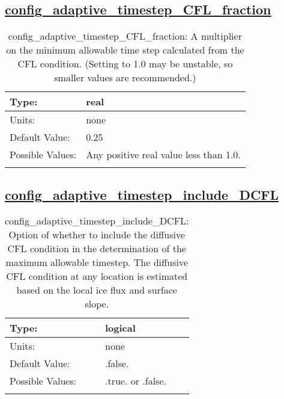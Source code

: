 \subsection[config\_adaptive\_timestep\_CFL\_fraction]{\hyperref[sec:nm_tab_time_integration]{config\_adaptive\_timestep\_CFL\_fraction}}
\label{subsec:nm_sec_config_adaptive_timestep_CFL_fraction}
\begin{center}
\begin{longtable}{| p{2.0in} || p{4.0in} |}
    \hline
    Type: & real \\
    \hline
    Units: & \si{none} \\
    \hline
    Default Value: & 0.25 \\
    \hline
    Possible Values: & Any positive real value less than 1.0. \\
    \hline
    \caption{config\_adaptive\_timestep\_CFL\_fraction: A multiplier on the minimum allowable time step calculated from the CFL condition. (Setting to 1.0 may be unstable, so smaller values are recommended.)}
\end{longtable}
\end{center}
\subsection[config\_adaptive\_timestep\_include\_DCFL]{\hyperref[sec:nm_tab_time_integration]{config\_adaptive\_timestep\_include\_DCFL}}
\label{subsec:nm_sec_config_adaptive_timestep_include_DCFL}
\begin{center}
\begin{longtable}{| p{2.0in} || p{4.0in} |}
    \hline
    Type: & logical \\
    \hline
    Units: & \si{none} \\
    \hline
    Default Value: & .false. \\
    \hline
    Possible Values: & .true. or .false. \\
    \hline
    \caption{config\_adaptive\_timestep\_include\_DCFL: Option of whether to include the diffusive CFL condition in the determination of the maximum allowable timestep. The diffusive CFL condition at any location is estimated based on the local ice flux and surface slope.}
\end{longtable}
\end{center}
